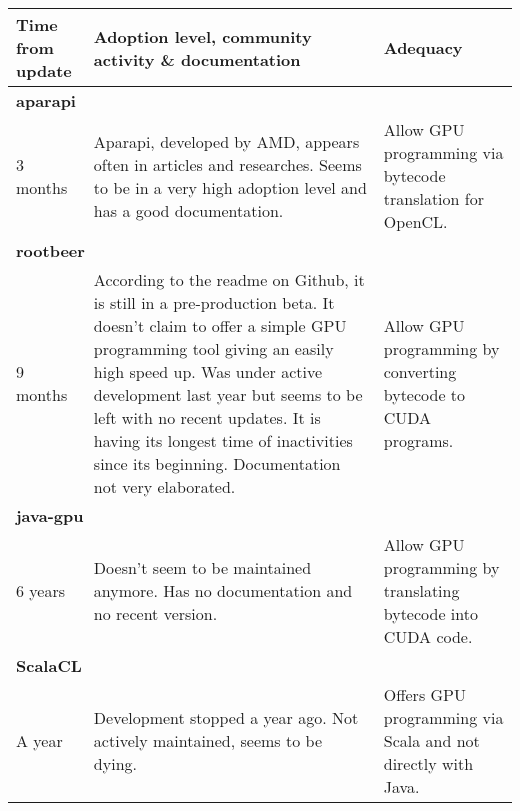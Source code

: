 \begin{longtable}{ | p{} | p{} | p{} | }
  
  \hline
  
  \textbf{Time from update} & \textbf{Adoption level, community activity \& documentation} & \textbf{Adequacy} \\
  
  \hline \hline
  
  \multicolumn{3}{|l|}{\textbf{aparapi}} \\

  \hline

  3 months &
  Aparapi, developed by AMD, appears often in articles and researches. Seems to be in a very high adoption level and has a good documentation. &
  Allow GPU programming via bytecode translation for OpenCL. \\
  
  \hline \hline

  \multicolumn{3}{|l|}{\textbf{rootbeer}} \\

  \hline

  9 months &
  According to the readme on Github, it is still in a pre-production beta. It doesn't claim to offer
  a simple GPU programming tool giving an easily high speed up. Was under active development last year but
  seems to be left with no recent updates. It is having its longest time of inactivities since its beginning.
  Documentation not very elaborated. &
  Allow GPU programming by converting bytecode to CUDA programs. \\
  
  \hline \hline
  
  \multicolumn{3}{|l|}{\textbf{java-gpu}} \\

  \hline

  6 years &
  Doesn't seem to be maintained anymore. Has no documentation and no recent version. &
  Allow GPU programming by translating bytecode into CUDA code. \\
  
  \hline \hline
  
  \multicolumn{3}{|l|}{\textbf{ScalaCL}} \\

  \hline

  A year &
  Development stopped a year ago. Not actively maintained, seems to be dying. &
  Offers GPU programming via Scala and not directly with Java. \\
  

\end{longtable}
